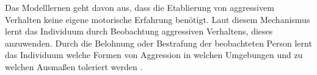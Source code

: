 Das Modelllernen geht davon aus, dass die Etablierung von aggressivem Verhalten keine eigene motorische Erfahrung benötigt. Laut diesem Mechanismus lernt das Individuum durch Beobachtung aggressiven Verhaltens, dieses anzuwenden. Durch die Belohnung oder Bestrafung der beobachteten Person lernt das Individuum welche Formen von Aggression in welchen Umgebungen und zu welchen Ausmaßen toleriert werden \parencite{Aggro_Theorie_Buch}.